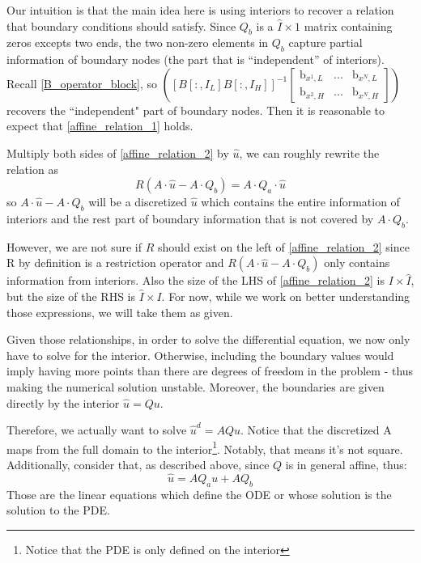 \documentclass[11pt]{article}
\begin{document}
\begin{itemize}
		Our intuition is that the main idea here is using interiors to recover a relation that boundary conditions should satisfy. Since $Q_b$ is a $\hat{I}\times 1$ matrix containing zeros excepts two ends, the two non-zero elements in $Q_b$ capture partial information of boundary nodes (the part that is ``independent'' of interiors).  Recall \eqref{B_operator_block}, so $\left([B[:, I_L] B[:, I_H]]^{-1}\begin{bmatrix}
		\text{b}_{x^{1},L} & ... & \text{b}_{x^{N},L}\\
		\text{b}_{x^{2},H} & ... & \text{b}_{x^{N},H}
		\end{bmatrix}\right)$ recovers the ``independent" part of boundary nodes. Then it is reasonable to expect that \eqref{affine_relation_1} holds.
		
		Multiply both sides of \eqref{affine_relation_2} by $\hat{u}$, we can roughly rewrite the relation as
		\begin{equation}
		R(A\cdot \hat{u}-A\cdot Q_b) = A\cdot Q_a\cdot \hat{u}
		\end{equation}
		so $A\cdot \hat{u}-A\cdot Q_b$ will be a discretized $\hat{u}$ which contains the entire information of interiors and the rest part of boundary information that is not covered by $A\cdot Q_b$. 
		
		However, we are not sure if $R$ should exist on the left of \eqref{affine_relation_2} since R by definition is a restriction operator and $R(A\cdot \hat{u}-A\cdot Q_b)$ only contains information from interiors. Also the size of the LHS of \eqref{affine_relation_2} is $I\times \hat{I}$, but the size of the RHS is $\hat{I}\times I$.
		For now, while we work on better understanding those expressions, we will take them as given.
		
		
		Given those relationships, in order to solve the differential equation, we now only have to solve for the interior. Otherwise, including the boundary values would imply having more points than there are degrees of freedom in the problem - thus making the numerical solution unstable. Moreover, the boundaries are given directly by the interior $\hat{u} = Qu$. 
		
		Therefore, we actually want to solve $\hat{u}^d = AQu$. Notice that the discretized A maps from the full domain to the interior\footnote{Notice that the PDE is only defined on the interior}. Notably, that means it's not square. Additionally, consider that, as described above, since $Q$ is in general affine, thus:
		\begin{equation}
		\hat{u} = AQ_au + AQ_b
		\end{equation}
	Those are the linear equations which define the ODE or whose solution is the solution to the PDE.
		

\end{itemize}
\end{document}

